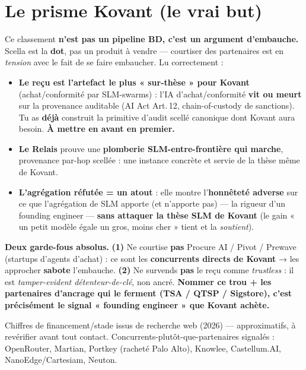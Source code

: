 \documentclass[11pt]{article}
\begin{document}
\section{Le prisme Kovant (le vrai but)}
Ce classement \textbf{n'est pas un pipeline BD, c'est un argument d'embauche.} Scella est la
\textbf{dot}, pas un produit à vendre — courtiser des partenaires est en \emph{tension} avec le fait
de se faire embaucher. Lu correctement :

\begin{itemize}[leftmargin=1.3em,itemsep=2pt,topsep=2pt]
\item \textbf{Le reçu est l'artefact le plus « sur-thèse » pour Kovant} (achat/conformité par
SLM-swarms) : l'IA d'achat/conformité \textbf{vit ou meurt} sur la provenance auditable (AI Act
Art.\,12, chain-of-custody de sanctions). Tu as \textbf{déjà} construit la primitive d'audit scellé
canonique dont Kovant aura besoin. \textbf{À mettre en avant en premier.}
\item \textbf{Le Relais} prouve une \textbf{plomberie SLM-entre-frontière qui marche}, provenance
par-hop scellée : une instance concrète et servie de la thèse même de Kovant.
\item \textbf{L'agrégation réfutée = un atout} : elle montre l'\textbf{honnêteté adverse} sur ce que
l'agrégation de SLM apporte (et n'apporte pas) — la rigueur d'un founding engineer — \textbf{sans
attaquer la thèse SLM de Kovant} (le gain « un petit modèle égale un gros, moins cher » tient et la
\emph{soutient}).
\end{itemize}

\begin{warn}
\textbf{\color{amber}Deux garde-fous absolus.} \textbf{(1)} Ne courtise \textbf{pas} Procure AI /
Pivot / Prewave (startups d'agents d'achat) : ce sont les \textbf{concurrents directs de Kovant} →
les approcher \textbf{sabote} l'embauche. \textbf{(2)} Ne survends \textbf{pas} le reçu comme
\emph{trustless} : il est \emph{tamper-evident détenteur-de-clé}, non ancré. \textbf{Nommer ce trou
+ les partenaires d'ancrage qui le ferment (TSA / QTSP / Sigstore), c'est précisément le signal
« founding engineer » que Kovant achète.}
\end{warn}

\vspace{4pt}
{\footnotesize\color{grey}Chiffres de financement/stade issus de recherche web (2026) —
approximatifs, à revérifier avant tout contact. Concurrents-plutôt-que-partenaires signalés :
OpenRouter, Martian, Portkey (racheté Palo Alto), Knowlee, Castellum.AI, NanoEdge/Cartesiam,
Neuton.}
\end{document}
